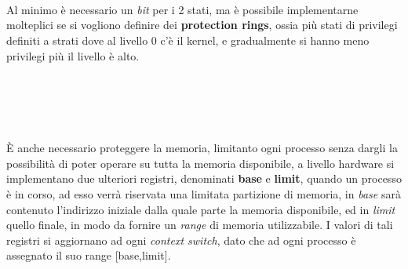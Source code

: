 \documentclass[12pt, letterpaper]{article}
\begin{document}
     \hphantom{,}\\ \hphantom{,}\\ \hphantom{,}\\Al minimo è necessario un \textit{bit} per i 2 stati, ma è possibile implementarne molteplici 
se si vogliono definire dei \textbf{protection rings}, ossia più stati di privilegi definiti a strati 
dove al livello 0 c'è il kernel, e gradualmente si hanno meno privilegi più il livello è alto. \hphantom{,}\\
\hphantom{,}\\ \hphantom{,}\\ \hphantom{,}\\ \hphantom{,}\\ \hphantom{,}\\
È anche necessario proteggere la memoria, limitanto ogni processo senza dargli la possibilità di poter
operare su tutta la memoria disponibile, a livello hardware si implementano due ulteriori registri, denominati
\textbf{base} e \textbf{limit}, quando un processo è in corso, ad esso verrà riservata una limitata partizione 
di memoria, in \textit{base} sarà contenuto l'indirizzo iniziale dalla quale parte la memoria disponibile, 
ed in \textit{limit} quello finale, in modo da fornire un \textit{range} di memoria utilizzabile. I valori di 
tali registri si aggiornano ad ogni \textit{context switch}, dato che ad ogni processo è assegnato il suo 
range [base,limit].
\end{document}
